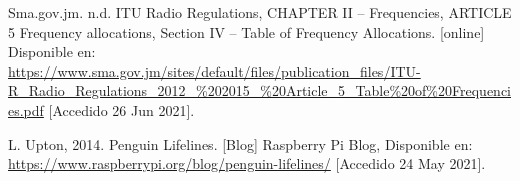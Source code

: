 \begin{flushleft}
\begin{thebibliography}{9}
Sma.gov.jm. n.d. ITU Radio Regulations, CHAPTER II – Frequencies, ARTICLE 5 Frequency allocations, Section IV – Table of Frequency Allocations. [online] Disponible en: \href{https://www.sma.gov.jm/sites/default/files/publication_files/ITU-R_Radio_Regulations_2012_\%202015_\%20Article_5_Table\%20of\%20Frequencies.pdf}{https://www.sma.gov.jm/sites/default/files/publication\_files/ITU-R\_Radio\_Regulations\_2012\_\%202015\_\%20Article\_5\_Table\%20of\%20Frequencies.pdf} [Accedido 26 Jun 2021].

L. Upton, 2014. Penguin Lifelines. [Blog] Raspberry Pi Blog, Disponible en: \href{https://www.raspberrypi.org/blog/penguin-lifelines/}{https://www.raspberrypi.org/blog/penguin-lifelines/} [Accedido 24 May 2021].

\end{thebibliography}
\end{flushleft}

%
